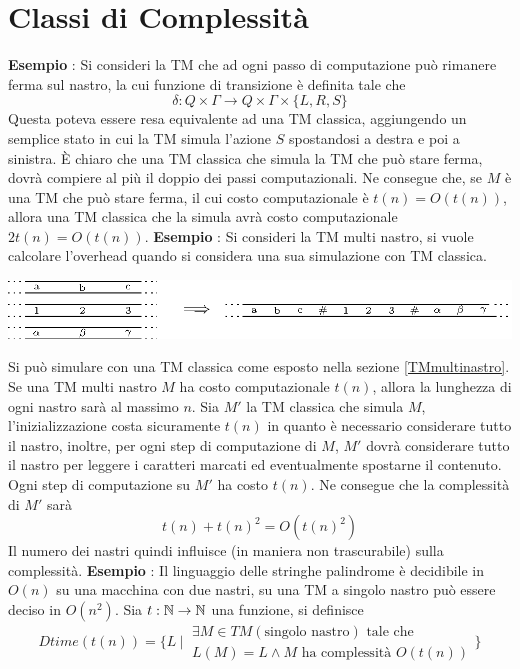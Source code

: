 \documentclass[10pt, letterpaper]{report}
\begin{document}
\section{Classi di Complessità}\label{classiComplessità}
\textbf{Esempio} : Si consideri la TM che ad ogni passo di computazione può rimanere ferma sul nastro, la cui funzione di transizione è definita tale che 
$$ \delta:Q\times\Gamma \rightarrow Q\times\Gamma\times \{L,R,S\}$$
Questa poteva essere resa equivalente ad una TM classica, aggiungendo un semplice stato in cui la TM simula l'azione $S$ spostandosi a destra e poi a sinistra. È chiaro che una TM classica che simula la TM che può stare ferma, dovrà compiere al più il doppio dei passi computazionali.\acc 
Ne consegue che, se $M$ è una TM che può stare ferma, il cui costo computazionale è $t(n)=O(t(n))$, allora una TM classica che la simula avrà costo computazionale $2t(n)=O(t(n))$.\acc 
\textbf{Esempio} : Si consideri la TM multi nastro, si vuole calcolare l'overhead quando si considera una sua simulazione con TM classica. \begin{center}
    \includegraphics[width=\textwidth ]{images/multinastro.eps}
\end{center}
Si può simulare con una TM classica come esposto nella sezione \ref{TMmultinastro}. Se una TM multi nastro $M$ ha costo computazionale $t(n)$, allora la lunghezza di ogni nastro sarà al massimo $n$. Sia $M'$ la TM classica che simula $M$, l'inizializzazione costa sicuramente $t(n)$ in quanto è necessario considerare tutto il nastro, inoltre, per ogni step di computazione di $M$, $M'$ dovrà considerare tutto il nastro per leggere i caratteri marcati ed eventualmente spostarne il contenuto. Ogni step di computazione su $M'$ ha costo $t(n)$. Ne consegue che la complessità di $M'$ sarà 
$$t(n)+t(n)^2 = O(t(n)^2)$$ Il numero dei nastri quindi influisce (in maniera non trascurabile) sulla complessità.\acc 
\textbf{Esempio} : Il linguaggio delle stringhe palindrome è decidibile in $O(n)$ su una macchina con due nastri, su una TM a singolo nastro può essere deciso in $O(n^2)$.\acc 
{}  Sia $t:{\mathbb N}\rightarrow {\mathbb N}$ una funzione, si definisce 
$$ Dtime(t(n))=\Bigg\{L \ |\ \begin{matrix}\exists M \in TM(\text{singolo nastro}) \text{ tale che }\\ L(M)=L\land M\text{ ha complessità }O(t(n))\end{matrix}\Bigg\}$$
\end{document}
